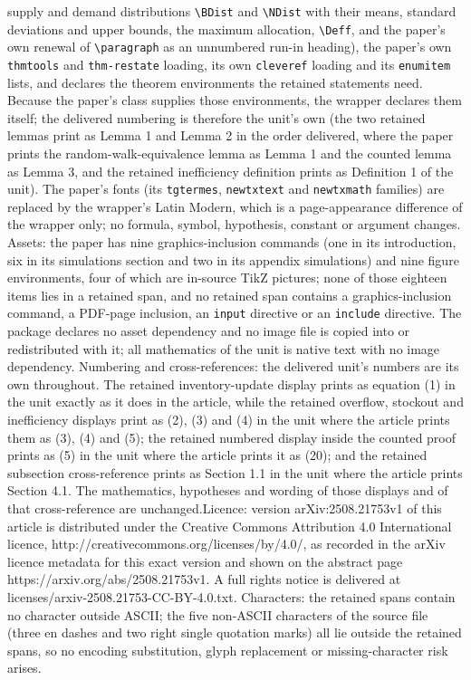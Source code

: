 \documentclass[10pt,a4paper]{amsart}
\theoremstyle{plain}
\theoremstyle{definition}
\theoremstyle{remark}
\begin{document}
supply and demand distributions \texttt{\textbackslash BDist} and \texttt{\textbackslash NDist} with their means, standard deviations and upper bounds, the maximum allocation, \texttt{\textbackslash Deff}, and the paper's own renewal of \texttt{\textbackslash paragraph} as an unnumbered run-in heading), the paper's own \texttt{thmtools} and \texttt{thm-restate} loading, its own \texttt{cleveref} loading and its \texttt{enumitem} lists, and declares the theorem environments the retained statements need. Because the paper's class supplies those environments, the wrapper declares them itself; the delivered numbering is therefore the unit's own (the two retained lemmas print as Lemma 1 and Lemma 2 in the order delivered, where the paper prints the random-walk-equivalence lemma as Lemma 1 and the counted lemma as Lemma 3, and the retained inefficiency definition prints as Definition 1 of the unit). The paper's fonts (its \texttt{tgtermes}, \texttt{newtxtext} and \texttt{newtxmath} families) are replaced by the wrapper's Latin Modern, which is a page-appearance difference of the wrapper only; no formula, symbol, hypothesis, constant or argument changes. Assets: the paper has nine graphics-inclusion commands (one in its introduction, six in its simulations section and two in its appendix simulations) and nine figure environments, four of which are in-source TikZ pictures; none of those eighteen items lies in a retained span, and no retained span contains a graphics-inclusion command, a PDF-page inclusion, an \texttt{input} directive or an \texttt{include} directive. The package declares no asset dependency and no image file is copied into or redistributed with it; all mathematics of the unit is native text with no image dependency. Numbering and cross-references: the delivered unit's numbers are its own throughout. The retained inventory-update display prints as equation (1) in the unit exactly as it does in the article, while the retained overflow, stockout and inefficiency displays print as (2), (3) and (4) in the unit where the article prints them as (3), (4) and (5); the retained numbered display inside the counted proof prints as (5) in the unit where the article prints it as (20); and the retained subsection cross-reference prints as Section 1.1 in the unit where the article prints Section 4.1. The mathematics, hypotheses and wording of those displays and of that cross-reference are unchanged.Licence: version arXiv:2508.21753v1 of this article is distributed under the Creative Commons Attribution 4.0 International licence, http://creativecommons.org/licenses/by/4.0/, as recorded in the arXiv licence metadata for this exact version and shown on the abstract page https://arxiv.org/abs/2508.21753v1. A full rights notice is delivered at licenses/arxiv-2508.21753-CC-BY-4.0.txt. Characters: the retained spans contain no character outside ASCII; the five non-ASCII characters of the source file (three en dashes and two right single quotation marks) all lie outside the retained spans, so no encoding substitution, glyph replacement or missing-character risk arises.
\end{document}
